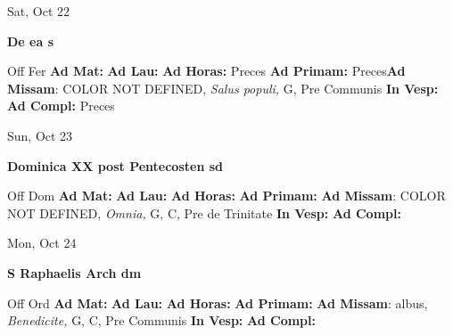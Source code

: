 \documentclass[10pt]{memoir}
\begin{document}
\begin{center}
\begin{minipage}{3.5in}
\vspace{2em}
\begin{center}Sat, Oct 22
\end{center}
\textbf{ \large De ea
\textnormal{\normalsize s}}

\begin{justify}Off Fer
\textbf{Ad Mat: }
\textbf{Ad Lau: }
\textbf{Ad Horas: }Preces
\textbf{Ad Primam: }Preces\textbf{Ad Missam}: COLOR NOT DEFINED, \textit{Salus populi,} G, Pre Communis
\textbf{In Vesp: }
\textbf{Ad Compl: }Preces
\end{justify}
\end{minipage}
\end{center}

\begin{center}
\begin{minipage}{3.5in}
\vspace{2em}
\begin{center}Sun, Oct 23
\end{center}
\textbf{ \large Dominica XX post Pentecosten
\textnormal{\normalsize sd}}

\begin{justify}Off Dom
\textbf{Ad Mat: }
\textbf{Ad Lau: }
\textbf{Ad Horas: }
\textbf{Ad Primam: }\textbf{Ad Missam}: COLOR NOT DEFINED, \textit{Omnia,} G, C, Pre de Trinitate
\textbf{In Vesp: }
\textbf{Ad Compl: }
\end{justify}
\end{minipage}
\end{center}

\begin{center}
\begin{minipage}{3.5in}
\vspace{2em}
\begin{center}Mon, Oct 24
\end{center}
\textbf{ \large S Raphaelis Arch
\textnormal{\normalsize dm}}

\begin{justify}Off Ord
\textbf{Ad Mat: }
\textbf{Ad Lau: }
\textbf{Ad Horas: }
\textbf{Ad Primam: }\textbf{Ad Missam}: albus, \textit{Benedicite,} G, C, Pre Communis
\textbf{In Vesp: }
\textbf{Ad Compl: }
\end{justify}
\end{minipage}
\end{center}
\end{document}
